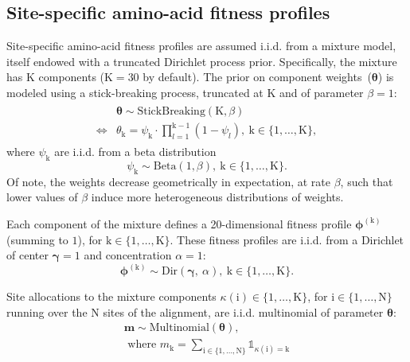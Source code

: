 \documentclass{article}
\newcommand{\UniDimArray}[1]{\bm{#1}}
\newcommand{\indice}{l}
\newcommand{\site}{\text{i}}
\newcommand{\Nsite}{\text{N}}
\newcommand{\Setsite}{\site \in \{1, \hdots, \Nsite\} }
\newcommand{\cat}{\text{k}}
\newcommand{\Ncat}{\text{K}}
\newcommand{\catexp}{^{(\cat)}}
\newcommand{\catInterval}{\{1, \hdots, \Ncat\}}
\newcommand{\Setcat}{\cat \in \catInterval }
\newcommand{\profile}{\phi}
\newcommand{\Profile}{\UniDimArray{\profile}}
\newcommand{\concentrationProfile}{\alpha}
\newcommand{\centerProfile}{\UniDimArray{\gamma}}
\newcommand{\catVar}{\kappa}
\newcommand{\catsite}{\catVar\left(\site\right)}
\newcommand{\catmultivar}{m}
\newcommand{\catMultiVar}{\UniDimArray{\catmultivar}}
\newcommand{\stickbreaking}{\theta}
\newcommand{\StickBreaking}{\UniDimArray{\stickbreaking}}
\newcommand{\stick}{\psi}
\newcommand{\stickbreakinghyper}{\beta}
\begin{document}
    \subsection{Site-specific amino-acid fitness profiles}
    \label{sec:profiles}
    Site-specific amino-acid fitness profiles are assumed i.i.d. from a mixture model, itself endowed with a truncated Dirichlet process prior.
    Specifically, the mixture has $\Ncat$ components ($\Ncat = 30$ by default).
    The prior on component weights~($\StickBreaking$) is modeled using a stick-breaking process, truncated at $\Ncat$ and of parameter $\stickbreakinghyper=1$:
    \begin{align}
        \label{eq:DistribStickBreaking}
        \begin{split}
            & \StickBreaking \sim \text{StickBreaking}\left( \Ncat, \stickbreakinghyper \right)\\
            \iff & \stickbreaking_{\cat} = \stick_{\cat}\cdot \prod _{{\indice=1}}^{{\cat-1}}\left(1-\stick_{\indice}\right),\ \Setcat,
        \end{split}
    \end{align}
    where $\stick_{\cat}$ are i.i.d. from a beta distribution
    \begin{equation}
        \label{eq:Beta}
        \stick_{\cat} \sim \text{Beta}\left( 1, \stickbreakinghyper \right),\ \Setcat.
    \end{equation}
    Of note, the weights decrease geometrically in expectation, at rate $\stickbreakinghyper$, such that lower values of $\stickbreakinghyper$ induce more heterogeneous distributions of weights.

    Each component of the mixture defines a 20-dimensional fitness profile $\Profile\catexp$ (summing to $1$), for $ \Setcat$.
    These fitness profiles are i.i.d. from a Dirichlet of center $\centerProfile=1$ and concentration $\concentrationProfile=1$:
    \begin{equation}
        \label{eq:DistribBase}
        \Profile\catexp \sim \text{Dir}\left( \centerProfile,\ \concentrationProfile \right),\ \Setcat.
    \end{equation}

    Site allocations to the mixture components $\catsite \in \catInterval $, for $\Setsite$ running over the $\Nsite$ sites of the alignment, are i.i.d. multinomial of parameter $\StickBreaking$:
    \begin{align}
        \label{eq:DistribMultinomial}
        \catMultiVar \sim \text{Multinomial}\left( \StickBreaking \right), \\
        \text{ where } \catmultivar_{\cat} = \sum_{\Setsite} \mathbb{1}_{\catsite = \cat}
    \end{align}
\end{document}
